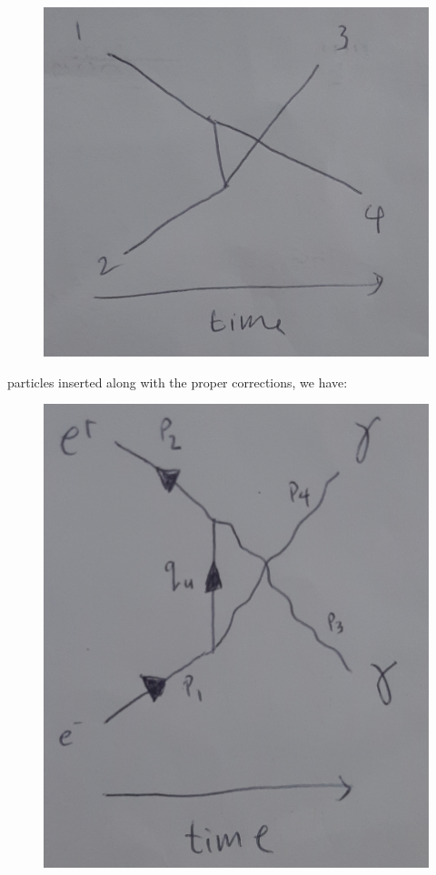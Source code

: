 \documentclass[11pt]{article}
\theoremstyle{definition}
\begin{document}
\begin{figure}[H]
    \centering
    \includegraphics[scale = 0.1]{general u-channel.jpg}
\end{figure}

particles inserted along with the proper corrections, we have:

\begin{figure}[H]
    \centering
    \includegraphics[scale = 0.1]{final u-channel.jpg}
\end{figure}
\end{document}
